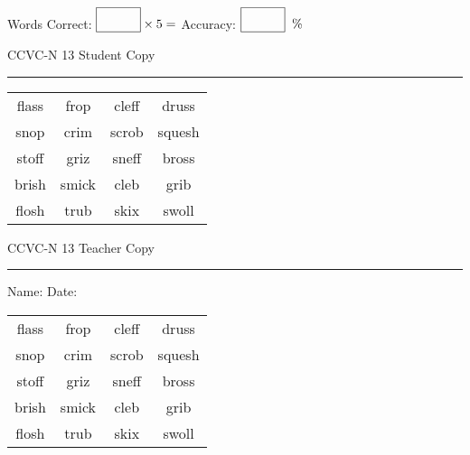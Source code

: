 \documentclass{memoir}
\begin{document}
\small

Words Correct: $\fbox{\phantom{\huge 100}} \times 5 = $ Accuracy: $\fbox{\phantom{\huge 100}}\;\; \%$ 

\vfill

\newpage


\footnotesize \noindent
CCVC-N 13 \hfill Student Copy
\smallskip
\hrule

\Large

\setlength{\tabcolsep}{14pt}
\def\arraystretch{3}

{\selectfont


\begin{vplace}[0.5]
\begin{center}
\begin{tabular}{cccc}
flass & frop & cleff            & druss \\
snop & crim & scrob & squesh \\
stoff & griz & sneff & bross       \\
brish & smick & cleb & grib                    \\
flosh & trub & skix & swoll \\
\end{tabular}
\end{center}
\end{vplace}

}

\newpage

\footnotesize \noindent
CCVC-N 13 \hfill Teacher Copy
\smallskip
\hrule

\small

\vfill

\noindent
Name: \underline{\hspace{1.75in}} \hfill Date: \underline{\hspace{1in}}

\Large

{\selectfont


\begin{vplace}[0.5]
\begin{center}
\begin{tabular}{cccc}
flass & frop & cleff            & druss \\
snop & crim & scrob & squesh \\
stoff & griz & sneff & bross       \\
brish & smick & cleb & grib                    \\
flosh & trub & skix & swoll \\
\end{tabular}
\end{center}
\end{vplace}



}
\end{document}
